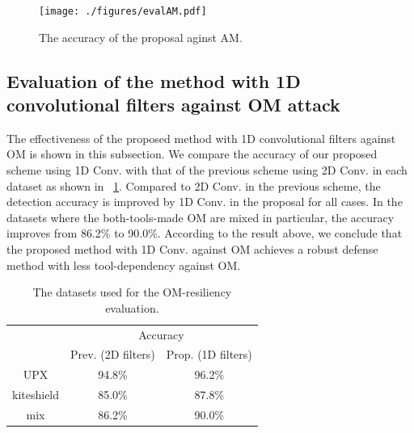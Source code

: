 \documentclass{ieeeaccess}
\begin{document}
\begin{figure}[t]
 \centering
 \texttt{[image: ./figures/evalAM.pdf]}
 \caption{The accuracy of the proposal aginst AM.} 
 \label{fig:evalAM}
\end{figure}

\subsection{Evaluation of the method with 1D convolutional filters against OM attack}
The effectiveness of the proposed method with 1D convolutional filters against OM is shown in this subsection.
We compare the accuracy of our proposed scheme using 1D Conv. with that of the previous scheme using 2D Conv. in each dataset as shown in \tablename~\ref{tab:evalOM}.
Compared to 2D Conv. in the previous scheme, the detection accuracy is improved by 1D Conv. in the proposal for all cases.
In the datasets where the both-tools-made OM are mixed in particular, the accuracy improves from 86.2\% to 90.0\%.
According to the result above, we conclude that the proposed method with 1D Conv. against OM achieves a robust defense method with less tool-dependency against OM.
\begin{table}[h]
  \begin{center}
    \caption{The datasets used for the OM-resiliency evaluation.}
    \label{tab:evalOM} 
    \begin{tabular}{|c|c|c|} \hline
      \multirow{2}{*}{\hfill  \hfill} & \multicolumn{2}{c|}{Accuracy}  \\ \cline{2-3} 
					     & Prev. (2D filters) & Prop. (1D filters) \\ \hline \hline
      UPX & 94.8\% & 96.2\% \\ \cline{1-3} 
      kiteshield & 85.0\% & 87.8\% \\ \cline{1-3} 
      mix & 86.2\% & 90.0\% \\ \cline{1-3} 
  \end{tabular}
  \end{center}
\end{table}
\end{document}
